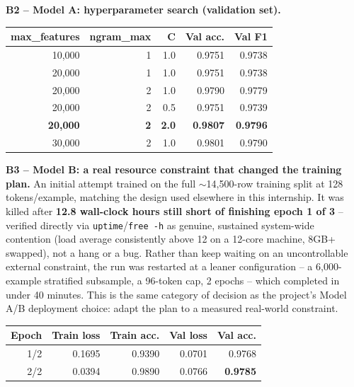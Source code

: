 \documentclass[11pt,a4paper]{article}
\begin{document}
\textbf{B2 -- Model A: hyperparameter search (validation set).}

\begin{table}[H]
\centering
\small
\begin{tabular}{rrrrr}
\toprule
\textbf{max\_features} & \textbf{ngram\_max} & \textbf{C} & \textbf{Val acc.} & \textbf{Val F1} \\
\midrule
10{,}000 & 1 & 1.0 & 0.9751 & 0.9738 \\
20{,}000 & 1 & 1.0 & 0.9751 & 0.9738 \\
20{,}000 & 2 & 1.0 & 0.9790 & 0.9779 \\
20{,}000 & 2 & 0.5 & 0.9751 & 0.9739 \\
\textbf{20{,}000} & \textbf{2} & \textbf{2.0} & \textbf{0.9807} & \textbf{0.9796} \\
30{,}000 & 2 & 1.0 & 0.9801 & 0.9790 \\
\bottomrule
\end{tabular}
\end{table}

\textbf{B3 -- Model B: a real resource constraint that changed the training plan.} An
initial attempt trained on the full $\sim$14{,}500-row training split at 128 tokens/example,
matching the design used elsewhere in this internship. It was killed after \textbf{12.8
wall-clock hours still short of finishing epoch 1 of 3} -- verified directly via
\texttt{uptime}/\texttt{free -h} as genuine, sustained system-wide contention (load average
consistently above 12 on a 12-core machine, 8GB+ swapped), not a hang or a bug. Rather than
keep waiting on an uncontrollable external constraint, the run was restarted at a leaner
configuration -- a 6{,}000-example stratified subsample, a 96-token cap, 2 epochs -- which
completed in under 40 minutes. This is the same category of decision as the project's
Model A/B deployment choice: adapt the plan to a measured real-world constraint.

\begin{table}[H]
\centering
\small
\begin{tabular}{rrrrr}
\toprule
\textbf{Epoch} & \textbf{Train loss} & \textbf{Train acc.} & \textbf{Val loss} & \textbf{Val acc.} \\
\midrule
1/2 & 0.1695 & 0.9390 & 0.0701 & 0.9768 \\
2/2 & 0.0394 & 0.9890 & 0.0766 & \textbf{0.9785} \\
\bottomrule
\end{tabular}
\end{table}
\end{document}
